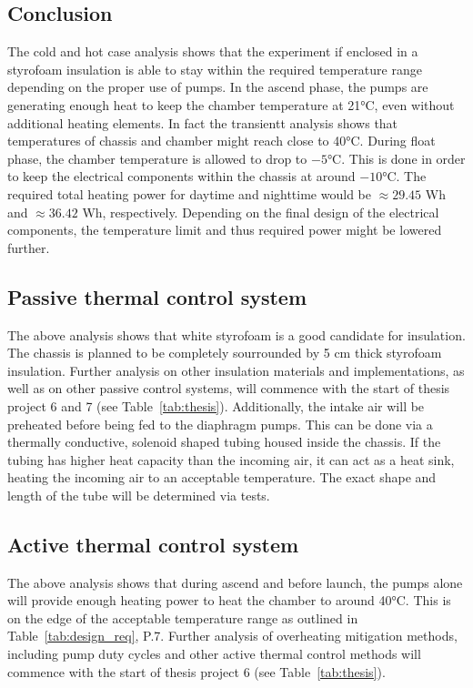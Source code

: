 \documentclass[
  a4paper,
  11pt,
  openany,
  parskip,
  toc=totoc,
  listof=totoc,
  bibliography=totoc
]{scrreprt}
\newcommand{\tref}[1]{Table~\ref{#1}}
\begin{document}
\subsection{Conclusion}\label{sec: thermal conclusion}
The cold and hot case analysis shows that the experiment if enclosed in a styrofoam insulation is able to stay within the required temperature range depending on the proper use of pumps. In the ascend phase, the pumps are generating enough heat to keep the chamber temperature at 21°C, even without additional heating elements. In fact the transientt analysis shows that temperatures of chassis and chamber might reach close to 40°C. During float phase, the chamber temperature is allowed to drop to $-5$°C. This is done in order to keep the electrical components within the chassis at around $-10$°C. The required total heating power for daytime and nighttime would be $\approx 29.45$ Wh and $\approx 36.42$ Wh, respectively. Depending on the final design of the electrical components, the temperature limit and thus required power might be lowered further.

\subsection{Passive thermal control system}
The above analysis shows that white styrofoam is a good candidate for insulation. The chassis is planned to be completely sourrounded by 5 cm thick styrofoam insulation. Further analysis on other insulation materials and implementations, as well as on other passive control systems, will commence with the start of thesis project 6 and 7 (see \tref{tab:thesis}). Additionally, the intake air will be preheated before being fed to the diaphragm pumps. This can be done via a thermally conductive, solenoid shaped tubing housed inside the chassis. If the tubing has higher heat capacity than the incoming air, it can act as a heat sink, heating the incoming air to an acceptable temperature. The exact shape and length of the tube will be determined via tests.

\subsection{Active thermal control system}
The above analysis shows that during ascend and before launch, the pumps alone will provide enough heating power to heat the chamber to around 40°C. This is on the edge of the acceptable temperature range as outlined in \tref{tab:design_req}, P.7. Further analysis of overheating mitigation methods, including pump duty cycles and other active thermal control methods will commence with the start of thesis project 6 (see \tref{tab:thesis}).\par 
\end{document}
